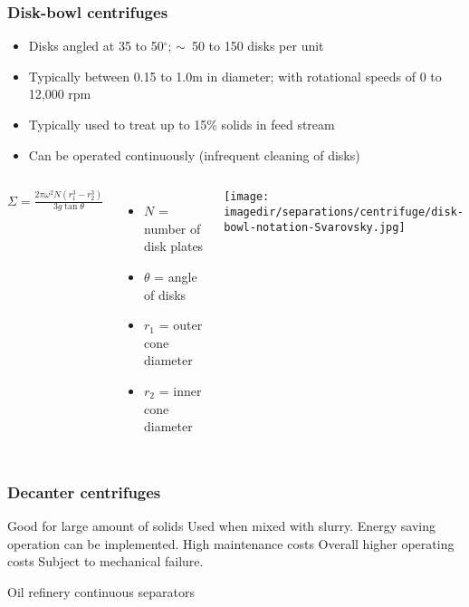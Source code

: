 \begin{frame}\frametitle{Disk-bowl centrifuges}
	\begin{itemize}
		\item	Disks angled at 35 to 50$^\circ$; $\sim$~50 to 150 disks per unit
		\item	Typically between 0.15 to 1.0m in diameter; with rotational speeds of 0 to 12,000 rpm
		\item	Typically used to treat up to 15\% solids in feed stream
		\item	Can be operated continuously (infrequent cleaning of disks)
	\end{itemize}
	\vspace{-12pt}
	\begin{columns}[c]
			$\Sigma = \displaystyle \frac{2\pi\omega^2 N(r_1^3 - r_2^3)}{3g \tan \theta}$
			\vspace{24pt}
			\begin{itemize}
				\item	$N$ = number of disk plates
				\item	$\theta$ = angle of disks
				\item	$r_1$ = outer cone diameter
				\item	$r_2$ = inner cone diameter
			\end{itemize}
			\begin{center}
				\texttt{[image: \\imagedir/separations/centrifuge/disk-bowl-notation-Svarovsky.jpg]}
			\end{center}
	\end{columns}
\end{frame}

\begin{frame}\frametitle{Decanter centrifuges}
	Good for large amount of solids 
	Used when mixed with slurry.  
	Energy saving operation can be implemented.  	High maintenance costs 
	Overall higher operating costs
	Subject to mechanical failure.
	
	Oil refinery continuous separators
	
\end{frame}

